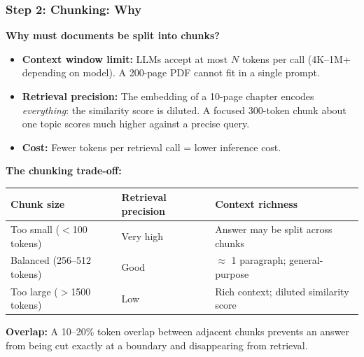 \begin{frame}[fragile]\frametitle{Step 2: Chunking: Why}

\textbf{Why must documents be split into chunks?}

\begin{itemize}
  \item \textbf{Context window limit:} LLMs accept at most $N$ tokens per call (4K--1M+ depending on model). A 200-page PDF cannot fit in a single prompt.
  \item \textbf{Retrieval precision:} The embedding of a 10-page chapter encodes \textit{everything}: the similarity score is diluted. A focused 300-token chunk about one topic scores much higher against a precise query.
  \item \textbf{Cost:} Fewer tokens per retrieval call = lower inference cost.
\end{itemize}

\vspace{0.3em}
\textbf{The chunking trade-off:}

\begin{center}
\small
\begin{tabular}{|p{2.2cm}|p{1.2cm}|p{3.2cm}|}
\hline
\textbf{Chunk size} & \textbf{Retrieval precision} & \textbf{Context richness} \\
\hline
Too small ($<$100 tokens)  & Very high & Answer may be split across chunks \\
Balanced (256--512 tokens) & Good      & $\approx$ 1 paragraph; general-purpose \\
Too large ($>$1500 tokens) & Low       & Rich context; diluted similarity score \\
\hline
\end{tabular}
\end{center}

\vspace{0.2em}
\textbf{Overlap:} A 10--20\% token overlap between adjacent chunks prevents an answer from being cut exactly at a boundary and disappearing from retrieval.

\end{frame}

